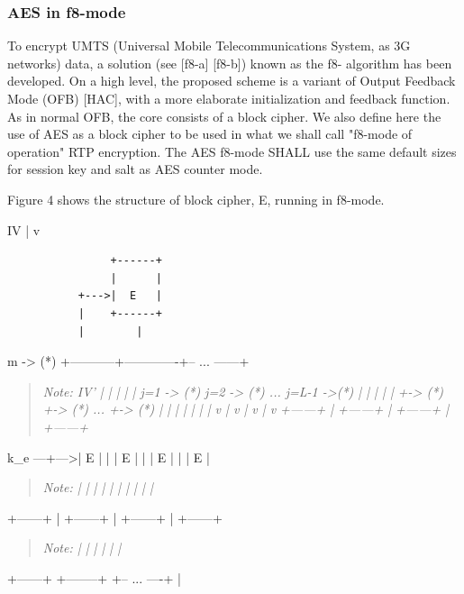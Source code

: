 \documentclass{article}
\begin{document}
\subsubsection{AES in f8-mode}

To encrypt UMTS (Universal Mobile Telecommunications System, as 3G networks) data, a solution (see [f8-a] [f8-b]) known as the f8- algorithm has been developed.  On a high level, the proposed scheme is a variant of Output Feedback Mode (OFB) [HAC], with a more elaborate initialization and feedback function.  As in normal OFB, the core consists of a block cipher.  We also define here the use of AES as a block cipher to be used in what we shall call "f8-mode of operation" RTP encryption.  The AES f8-mode SHALL use the same default sizes for session key and salt as AES counter mode.

Figure 4 shows the structure of block cipher, E, running in f8-mode.

IV | v

\begin{verbatim}
                +------+
                |      |
           +--->|  E   |
           |    +------+
           |        |
\end{verbatim}

m -> (*)       +-----------+-------------+--  ...     ------+

\begin{quote}
\textit{Note: IV' |           |             |                  | |   j=1 -> (*)    j=2 -> (*)   ...  j=L-1 ->(*) |           |             |                  | |      +-> (*)       +-> (*)   ...      +-> (*) |      |    |        |    |             |    | v      |    v        |    v             |    v +------+   | +------+    | +------+         | +------+}
\end{quote}

k\_e ---+--->|  E   |   | |  E   |    | |  E   |         | |  E   |

\begin{quote}
\textit{Note: |   | |      |    | |      |         | |      |}
\end{quote}

+------+   | +------+    | +------+         | +------+

\begin{quote}
\textit{Note: |    |        |    |             |    |}
\end{quote}

+------+    +--------+    +--  ...  ----+    |
\end{document}
